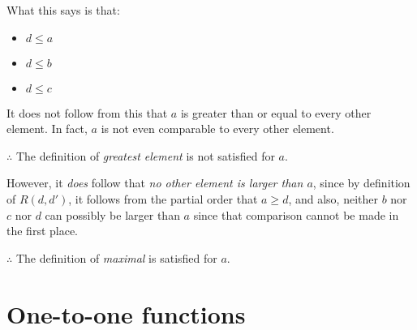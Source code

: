 \documentclass[12pt]{article}
\begin{document}
\begin{enumerate}
What this says is that:

\begin{itemize}
    \item $d \leq a$
    \item $d \leq b$
    \item $d \leq c$
\end{itemize}

It does not follow from this that $a$ is greater than or equal to every other element. In fact, $a$ is not even comparable to every other element.

$\therefore$ The definition of \emph{greatest element} is not satisfied for $a$.

However, it \emph{does} follow that \emph{no other element is larger than $a$}, since by definition of $R(d, d')$, it follows from the partial order that $a \geq d$, and also, neither $b$ nor $c$ nor $d$ can possibly be larger than $a$ since that comparison cannot be made in the first place.

$\therefore$ The definition of \emph{maximal} is satisfied for $a$.




\end{enumerate}

\newpage

\section{One-to-one functions}
\end{document}
